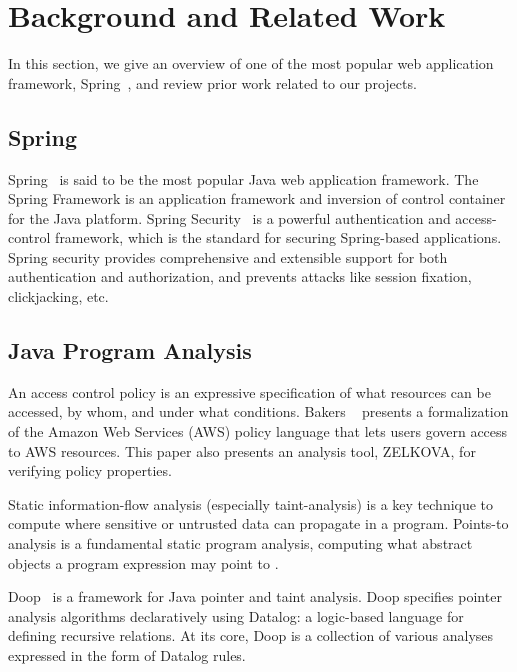 \section{Background and Related Work} %
In this section, we give an overview of one of the most popular web application
framework, Spring~\cite{spring+security:home}, and review prior work related to
our projects.

\subsection{Spring}

Spring~\cite{spring+security:home} is said to be the most popular Java web
application framework.
%
The Spring Framework is an application framework and inversion of control
container for the Java platform.
%
Spring Security~\cite{spring+security:method} is a powerful authentication and
access-control framework, which is the standard for securing Spring-based
applications.
%
Spring security provides comprehensive and extensible support for both
authentication and authorization, and prevents attacks like session fixation,
clickjacking, etc.

\subsection{Java Program Analysis}

An access control policy is an expressive specification of what resources can be
accessed, by whom, and under what conditions. Bakers
\etal~\cite{Backes+etal:2018:Zelkova} presents a formalization of the Amazon Web
Services (AWS) policy language  that lets users govern access to AWS resources.
This paper also presents an analysis tool, ZELKOVA, for verifying policy
properties.

Static information-flow analysis (especially taint-analysis) is a key technique
to compute where sensitive or untrusted data can propagate in a program.
Points-to analysis is a fundamental static program analysis, computing what
abstract objects a program expression may point to \cite{10.1145/3133926}.

Doop~\cite{Bravenboer:2009:Doop} is a framework for Java pointer and taint
analysis.
%
Doop specifies pointer analysis algorithms declaratively using Datalog: a
logic-based language for defining recursive relations.
%
At its core, Doop is a collection of various analyses expressed in the form of
Datalog rules.

